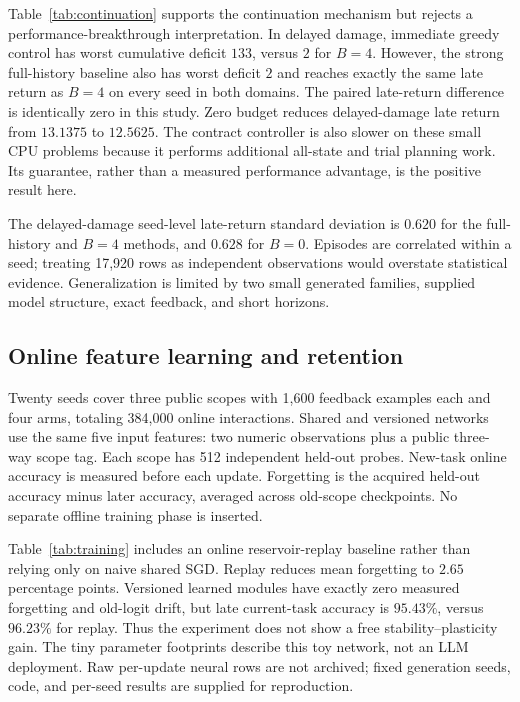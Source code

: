 \documentclass[10pt,twocolumn]{article}
\begin{document}
Table~\ref{tab:continuation} supports the continuation mechanism but rejects a
performance-breakthrough interpretation. In delayed damage, immediate greedy
control has worst cumulative deficit $133$, versus $2$ for $B=4$. However, the
strong full-history baseline also has worst deficit $2$ and reaches exactly the
same late return as $B=4$ on every seed in both domains. The paired late-return
difference is identically zero in this study. Zero budget reduces delayed-damage
late return from $13.1375$ to $12.5625$. The contract controller is also slower on
these small CPU problems because it performs additional all-state and trial
planning work. Its guarantee, rather than a measured performance advantage, is
the positive result here.

The delayed-damage seed-level late-return standard deviation is $0.620$ for the
full-history and $B=4$ methods, and $0.628$ for $B=0$. Episodes are correlated
within a seed; treating 17,920 rows as independent observations would overstate
statistical evidence. Generalization is limited by two small generated families,
supplied model structure, exact feedback, and short horizons.

\subsection{Online feature learning and retention}
Twenty seeds cover three public scopes with 1,600 feedback examples each and four
arms, totaling 384,000 online interactions. Shared and versioned networks use the
same five input features: two numeric observations plus a public three-way scope
tag. Each scope has 512 independent held-out probes. New-task online accuracy is
measured before each update. Forgetting is the acquired held-out accuracy minus
later accuracy, averaged across old-scope checkpoints. No separate offline training
phase is inserted.

\begin{table}[t]
\centering\small

\caption{Executed learned-feature diagnostic, means over twenty seeds. Early and
late use the first 100 and last 200 examples per scope. Forgetting is in percentage
points. The near-matched shared model has 4,040 parameter bytes versus 4,056 for
three immutable modules. Replay additionally stores 10,752 payload bytes, excluding
Python overhead, and approximately doubles online updates.}
\label{tab:training}
\end{table}

Table~\ref{tab:training} includes an online reservoir-replay baseline rather than
relying only on naive shared SGD. Replay reduces mean forgetting to $2.65$
percentage points. Versioned learned modules have exactly zero measured forgetting
and old-logit drift, but late current-task accuracy is $95.43\%$, versus $96.23\%$
for replay. Thus the experiment does not show a free stability--plasticity gain.
The tiny parameter footprints describe this toy network, not an LLM deployment.
Raw per-update neural rows are not archived; fixed generation seeds, code, and
per-seed results are supplied for reproduction.
\end{document}
